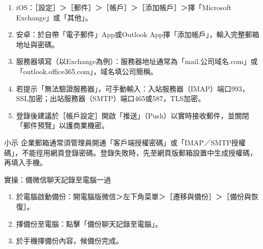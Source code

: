 \begin{enumerate}
  \item iOS：［設定］＞［郵件］＞［帳戶］＞［添加帳戶］＞擇「Microsoft Exchange」或「其他」。
  \item 安卓：於自帶「電子郵件」App或Outlook App擇「添加帳戶」，輸入完整郵箱地址與密碼。
  \item 服務器填寫（以Exchange為例）：服務器地址通常為「mail.公司域名.com」或「outlook.office365.com」，域名填公司簡稱。
  \item 若提示「無法驗證服務器」，可手動輸入：入站服務器（IMAP）端口993，SSL加密；出站服務器（SMTP）端口465或587，TLS加密。
  \item 登錄後建議於［帳戶設定］開啟「推送」（Push）以實時接收郵件，並關閉「郵件預覽」以護商業機密。
\end{enumerate}

\begin{tcbinfo}{小示}
企業郵箱通常須管理員開通「客戶端授權密碼」或「IMAP／SMTP授權碼」，不能徑用網頁登錄密碼。登錄失敗時，先至網頁版郵箱設置中生成授權碼，再填入手機。

\end{tcbinfo}

\begin{tcbpractice}{實操：備微信聊天記錄至電腦一過}
\begin{enumerate}
  \item 於電腦啟動備份：開電腦版微信＞左下角菜單＞［遷移與備份］＞［備份與恢復］。
  \item 擇備份至電腦：點擊「備份聊天記錄至電腦」。
  \item 於手機擇備份內容，候備份完成。
\end{enumerate}

\end{tcbpractice}
